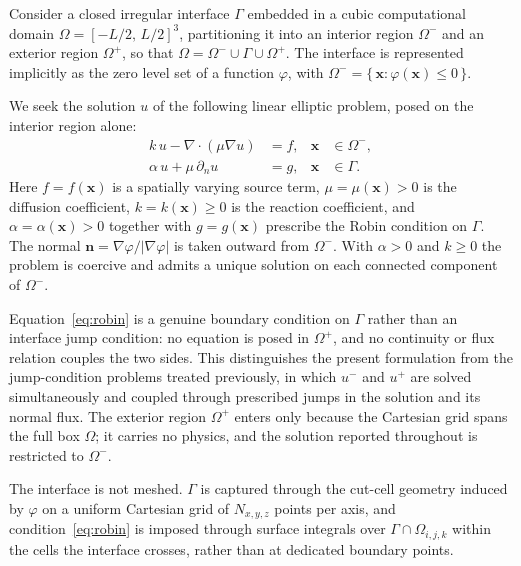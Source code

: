 
Consider a closed irregular interface $\Gamma$ embedded in a cubic computational
domain $\Omega = [-L/2,\, L/2]^{3}$, partitioning it into an interior region
$\Omega^{-}$ and an exterior region $\Omega^{+}$, so that
$\Omega = \Omega^{-} \cup \Gamma \cup \Omega^{+}$. The interface is represented
implicitly as the zero level set of a function $\varphi$, with
$\Omega^{-} = \{\, \mathbf{x} : \varphi(\mathbf{x}) \leq 0 \,\}$.

We seek the solution $u$ of the following linear elliptic problem, posed on the
interior region alone:
\begin{align}
    k\,u - \nabla \cdot (\mu \nabla u) &= f, & \mathbf{x} &\in \Omega^{-}, \label{eq:pde}\\
    \alpha\, u + \mu\, \partial_{n} u &= g, & \mathbf{x} &\in \Gamma. \label{eq:robin}
\end{align}
Here $f = f(\mathbf{x})$ is a spatially varying source term, $\mu = \mu(\mathbf{x}) > 0$
is the diffusion coefficient, $k = k(\mathbf{x}) \geq 0$ is the reaction coefficient,
and $\alpha = \alpha(\mathbf{x}) > 0$ together with $g = g(\mathbf{x})$ prescribe the
Robin condition on $\Gamma$. The normal $\mathbf{n} = \nabla \varphi / |\nabla \varphi|$
is taken outward from $\Omega^{-}$. With $\alpha > 0$ and $k \geq 0$ the problem is
coercive and admits a unique solution on each connected component of $\Omega^{-}$.

Equation~\eqref{eq:robin} is a genuine boundary condition on $\Gamma$ rather than an
interface jump condition: no equation is posed in $\Omega^{+}$, and no continuity or
flux relation couples the two sides. This distinguishes the present formulation from
the jump-condition problems treated previously, in which $u^{-}$ and $u^{+}$ are
solved simultaneously and coupled through prescribed jumps in the solution and its
normal flux. The exterior region $\Omega^{+}$ enters only because the Cartesian grid
spans the full box $\Omega$; it carries no physics, and the solution reported
throughout is restricted to $\Omega^{-}$.

The interface is not meshed. $\Gamma$ is captured through the cut-cell geometry
induced by $\varphi$ on a uniform Cartesian grid of $N_{x,y,z}$ points per axis, and
condition~\eqref{eq:robin} is imposed through surface integrals over
$\Gamma \cap \Omega_{i,j,k}$ within the cells the interface crosses, rather than at
dedicated boundary points.
